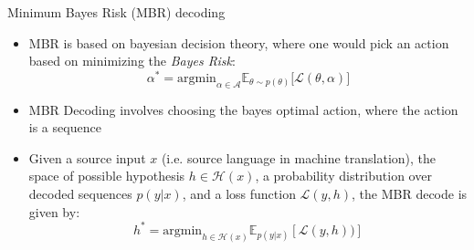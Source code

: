 \begin{vbframe}{Minimum Bayes Risk (MBR) decoding}


\vfill

\begin{itemize}
    \item MBR is based on bayesian decision theory, where one would pick an action based on minimizing the \textit{Bayes Risk}:
    $$\alpha^* = \text{argmin}_{\alpha \in \mathcal{A}} \mathbb{E}_{\theta \sim p(\theta)}[\mathcal{L(\theta, \alpha)]}$$
    \item MBR Decoding involves choosing the bayes optimal action, where the action is a sequence
    \item Given a source input $x$ (i.e. source language in machine translation), the space of possible hypothesis $h \in \mathcal{H}(x)$, a probability distribution over decoded sequences $p(y|x)$, and a loss function $\mathcal{L}(y,h)$, the MBR decode is given by:
    $$h^* = \text{argmin}_{h \in \mathcal{H}(x)}\mathbb{E}_{p(y|x)}[\mathcal{L}(y,h))]$$
\end{itemize}

\vfill

\end{vbframe}


